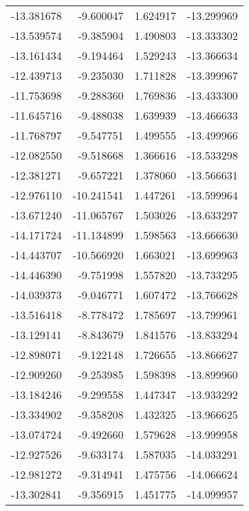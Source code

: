 \begin{tabular}{rrrr}
      -13.381678 &        -9.600047 &    1.624917 & -13.299969 \\
      -13.539574 &        -9.385904 &    1.490803 & -13.333302 \\
      -13.161434 &        -9.194464 &    1.529243 & -13.366634 \\
      -12.439713 &        -9.235030 &    1.711828 & -13.399967 \\
      -11.753698 &        -9.288360 &    1.769836 & -13.433300 \\
      -11.645716 &        -9.488038 &    1.639939 & -13.466633 \\
      -11.768797 &        -9.547751 &    1.499555 & -13.499966 \\
      -12.082550 &        -9.518668 &    1.366616 & -13.533298 \\
      -12.381271 &        -9.657221 &    1.378060 & -13.566631 \\
      -12.976110 &       -10.241541 &    1.447261 & -13.599964 \\
      -13.671240 &       -11.065767 &    1.503026 & -13.633297 \\
      -14.171724 &       -11.134899 &    1.598563 & -13.666630 \\
      -14.443707 &       -10.566920 &    1.663021 & -13.699963 \\
      -14.446390 &        -9.751998 &    1.557820 & -13.733295 \\
      -14.039373 &        -9.046771 &    1.607472 & -13.766628 \\
      -13.516418 &        -8.778472 &    1.785697 & -13.799961 \\
      -13.129141 &        -8.843679 &    1.841576 & -13.833294 \\
      -12.898071 &        -9.122148 &    1.726655 & -13.866627 \\
      -12.909260 &        -9.253985 &    1.598398 & -13.899960 \\
      -13.184246 &        -9.299558 &    1.447347 & -13.933292 \\
      -13.334902 &        -9.358208 &    1.432325 & -13.966625 \\
      -13.074724 &        -9.492660 &    1.579628 & -13.999958 \\
      -12.927526 &        -9.633174 &    1.587035 & -14.033291 \\
      -12.981272 &        -9.314941 &    1.475756 & -14.066624 \\
      -13.302841 &        -9.356915 &    1.451775 & -14.099957 \\

\end{tabular}
